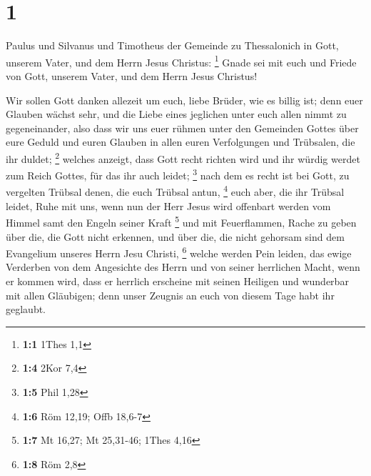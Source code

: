 \hypertarget{section}{%
\section{1}\label{section}}

 Paulus und Silvanus und Timotheus der Gemeinde zu
Thessalonich in Gott, unserem Vater, und dem Herrn Jesus Christus:
\footnote{\textbf{1:1} 1Thes 1,1}  Gnade sei mit euch und
Friede von Gott, unserem Vater, und dem Herrn Jesus Christus!

 Wir sollen Gott danken allezeit um euch, liebe Brüder, wie
es billig ist; denn euer Glauben wächst sehr, und die Liebe eines
jeglichen unter euch allen nimmt zu gegeneinander,  also
dass wir uns euer rühmen unter den Gemeinden Gottes über eure Geduld und
euren Glauben in allen euren Verfolgungen und Trübsalen, die ihr duldet;
\footnote{\textbf{1:4} 2Kor 7,4}  welches anzeigt, dass Gott
recht richten wird und ihr würdig werdet zum Reich Gottes, für das ihr
auch leidet; \footnote{\textbf{1:5} Phil 1,28}  nach dem es
recht ist bei Gott, zu vergelten Trübsal denen, die euch Trübsal antun,
\footnote{\textbf{1:6} Röm 12,19; Offb 18,6-7}  euch aber,
die ihr Trübsal leidet, Ruhe mit uns, wenn nun der Herr Jesus wird
offenbart werden vom Himmel samt den Engeln seiner Kraft \footnote{\textbf{1:7}
  Mt 16,27; Mt 25,31-46; 1Thes 4,16}  und mit Feuerflammen,
Rache zu geben über die, die Gott nicht erkennen, und über die, die
nicht gehorsam sind dem Evangelium unseres Herrn Jesu Christi,
\footnote{\textbf{1:8} Röm 2,8}  welche werden Pein leiden,
das ewige Verderben von dem Angesichte des Herrn und von seiner
herrlichen Macht,  wenn er kommen wird, dass er herrlich
erscheine mit seinen Heiligen und wunderbar mit allen Gläubigen; denn
unser Zeugnis an euch von diesem Tage habt ihr geglaubt.

